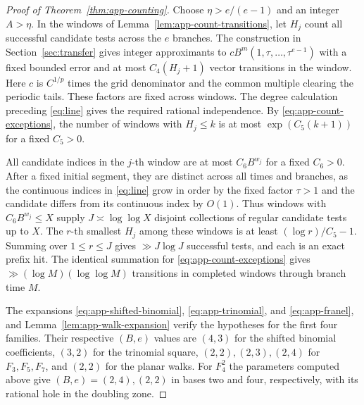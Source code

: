 \documentclass[11pt,reqno,a4paper]{amsart}
\theoremstyle{remark}
\begin{document}
\begin{proof}[Proof of Theorem~\ref{thm:app-counting}]
Choose \(\eta>e/(e-1)\) and an integer \(A>\eta\). In the windows
of Lemma~\ref{lem:app-count-transitions}, let \(H_j\) count all
successful candidate tests across the \(e\) branches. The construction
in Section~\ref{sec:transfer} gives integer approximants to
\(c B^m(1,\tau,\ldots,\tau^{e-1})\) with a fixed bounded error and at
most \(C_4(H_j+1)\) vector transitions in the window. Here \(c\)
is \(C^{1/p}\) times the grid denominator and the common multiple
clearing the periodic tails. These factors are fixed across
windows. The degree calculation preceding \eqref{eq:line} gives
the required rational independence. By \eqref{eq:app-count-exceptions},
the number of windows with \(H_j\le k\) is at most
\(\exp(C_5(k+1))\) for a fixed \(C_5>0\).

All candidate indices in the \(j\)-th window are at most
\(C_6 B^{w_j}\) for a fixed \(C_6>0\). After a fixed initial
segment, they are distinct across all times and branches, as the
continuous indices in \eqref{eq:line} grow in order by the fixed
factor \(\tau>1\) and the candidate differs from its continuous
index by \(O(1)\). Thus windows with \(C_6B^{w_j}\le X\) supply
\(J\asymp\log\log X\) disjoint collections of regular candidate
tests up to \(X\). The \(r\)-th smallest \(H_j\) among these windows
is at least \((\log r)/C_5-1\). Summing over \(1\le r\le J\)
gives \(\gg J\log J\) successful tests, and each is an exact
prefix hit. The identical summation for \eqref{eq:app-count-exceptions}
gives \(\gg(\log M)(\log\log M)\) transitions in completed windows
through branch time \(M\).

The expansions \eqref{eq:app-shifted-binomial},
\eqref{eq:app-trinomial}, and \eqref{eq:app-franel}, and
Lemma~\ref{lem:app-walk-expansion} verify the hypotheses for
the first four families. Their respective \((B,e)\) values
are \((4,3)\) for the shifted binomial coefficients, \((3,2)\)
for the trinomial square, \((2,2),(2,3),(2,4)\) for \(F_3,F_5,F_7\),
and \((2,2)\) for the planar walks. For \(F_4^2\) the parameters
computed above give \((B,e)=(2,4),(2,2)\) in bases two and four,
respectively, with its rational hole in the doubling zone.
\end{proof}
\end{document}
